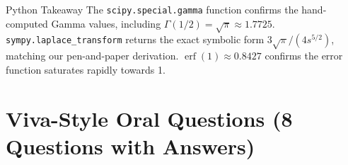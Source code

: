 \documentclass[12pt,a4paper]{article}
\begin{document}
\begin{learnbox}{Python Takeaway}
The \texttt{scipy.special.gamma} function confirms the hand-computed Gamma
values, including $\Gamma(1/2) = \sqrt{\pi} \approx 1.7725$.
\texttt{sympy.laplace\_transform} returns the exact symbolic form
$3\sqrt{\pi}/(4s^{5/2})$, matching our pen-and-paper derivation.
$\operatorname{erf}(1) \approx 0.8427$ confirms the error function saturates
rapidly towards 1.
\end{learnbox}

\section{Viva-Style Oral Questions (8 Questions with Answers)}
\end{document}
